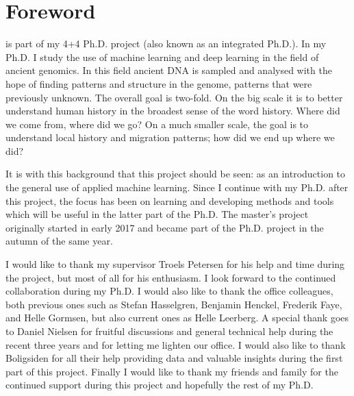 \chapter*{Foreword}

 is part of my 4+4 Ph.D. project (also known as an integrated Ph.D.). In my Ph.D. I study the use of machine learning and deep learning in the field of ancient genomics. In this field ancient DNA is sampled and analysed with the hope of finding patterns and structure in the genome, patterns that were previously unknown. The overall goal is two-fold. On the big scale it is to better understand human history in the broadest sense of the word history. Where did we come from, where did we go? On a much smaller scale, the goal is to understand local history and migration patterns; how did we end up where we did? 

It is with this background that this project should be seen: as an introduction to the general use of applied machine learning. Since I continue with my Ph.D. after this project, the focus has been on learning and developing methods and tools which will be useful in the latter part of the Ph.D. The master's project originally started in early \num{2017} and became part of the Ph.D. project in the autumn of the same year. 

I would like to thank my supervisor Troels Petersen for his help and time during the project, but most of all for his enthusiasm. I look forward to the continued collaboration during my Ph.D. I would also like to thank the office colleagues, both previous ones such as Stefan Hasselgren, Benjamin Henckel, Frederik Faye, and Helle Gormsen, but also current ones as Helle Leerberg. A special thank goes to Daniel Nielsen for fruitful discussions and general technical help during the recent three years and for letting me lighten our office. I would also like to thank Boligsiden for all their help providing data and valuable insights during the first part of this project. Finally I would like to thank my friends and family for the continued support during this project and hopefully the rest of my Ph.D. 
